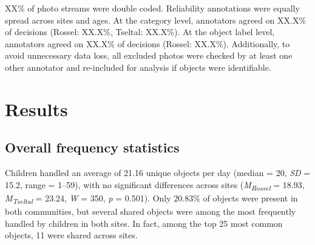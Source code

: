\documentclass[10pt, letterpaper]{article}
\begin{document}
XX\% of photo streams were double coded. Reliability annotations were
equally spread across sites and ages. At the category level, annotators
agreed on XX.X\% of decisions (Rossel: XX.X\%, Tseltal: XX.X\%). At the
object label level, annotators agreed on XX.X\% of decisions (Rossel:
XX.X\%). Additionally, to avoid unnecessary data loss, all excluded
photos were checked by at least one other annotator and re-included for
analysis if objects were identifiable.

\begin{table}[!ht]
\centering
{}
\caption{Objects handled by the most children across categories and sites.} 
\label{tab:top-objects}
\end{table}

\hypertarget{results}{%
\section{Results}\label{results}}

\hypertarget{overall-frequency-statistics}{%
\subsection{Overall frequency
statistics}\label{overall-frequency-statistics}}

Children handled an average of 21.16 unique objects per day (median =
20, \emph{SD} = 15.2, range = 1--59), with no significant differences
across sites (\emph{M}\textsubscript{\emph{Rossel}} = 18.93,
\emph{M}\textsubscript{\emph{Tseltal}} = 23.24, \emph{W} = 350, \emph{p}
= 0.501). Only 20.83\% of objects were present in both communities, but
several shared objects were among the most frequently handled by
children in both sites. In fact, among the top 25 most common objects,
11 were shared across sites.
\end{document}
